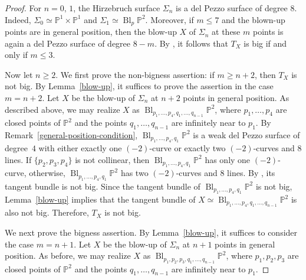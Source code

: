 \documentclass[reqno]{amsart}
\theoremstyle{definition}
\newcommand{\PP}{\mathbb{P}}
\newcommand{\tS}{X}
\newcommand{\Bl}{\operatorname{Bl}}
\begin{document}
\begin{proof}
For $n=0,\,1$, the Hirzebruch surface $\Sigma_n$ is a del Pezzo surface of degree $8$.
Indeed, $\Sigma_0\simeq\PP^1\times\PP^1$ and $\Sigma_1\simeq \Bl_p\PP^2$.
Moreover, if $m\leq 7$ and the blown-up points are in general position, then the blow-up $\tS$ of $\Sigma_n$ at these $m$ points is again a del Pezzo surface of degree $8-m$.
By \cite{HLS22}, it follows that $T_{\tS}$ is big if and only if $m\leq 3$.

Now let $n\geq 2$.
We first prove the non-bigness assertion: if $m\geq n+2$, then $T_{\tS}$ is not big.
By Lemma~\ref{blow-up}, it suffices to prove the assertion in the case $m=n+2$.
Let $\tS$ be the blow-up of $\Sigma_n$ at $n+2$ points in general position.
As described above, we may realize $\tS$ as $\Bl_{p_1,\ldots,p_4,q_1,\ldots,q_{n-1}}\PP^2$, where $p_1,\ldots,p_4$ are closed points of $\PP^2$ and the points $q_1,\ldots,q_{n-1}$ are infinitely near to $p_1$.
By Remark~\ref{general-position-condition}, $\Bl_{p_1,\ldots,p_4,q_1}\PP^2$ is a weak del Pezzo surface of degree~$4$ with either exactly one $(-2)$-curve or exactly two $(-2)$-curves and 8 lines.
If $\{p_2,p_3,p_4\}$ is not collinear, then $\Bl_{p_1,\ldots,p_4,q_1}\PP^2$ has only one $(-2)$-curve, otherwise, $\Bl_{p_1,\ldots,p_4,q_1}\PP^2$ has two $(-2)$-curves and $8$ lines.
By \cite[Theorem~1.2]{KKL24}, its tangent bundle is not big.
Since the tangent bundle of $\Bl_{p_1,\ldots,p_4,q_1}\PP^2$ is not big, Lemma~\ref{blow-up} implies that the tangent bundle of $\tS\simeq \Bl_{p_1,\ldots,p_4,q_1,\ldots,q_{n-1}}\PP^2$ is also not big.
Therefore, $T_{\tS}$ is not big.

We next prove the bigness assertion.
By Lemma~\ref{blow-up}, it suffices to consider the case $m=n+1$.
Let $\tS$ be the blow-up of $\Sigma_n$ at $n+1$ points in general position.
As before, we may realize $\tS$ as $\Bl_{p_1,p_2,p_3,q_1,\ldots,q_{n-1}}\PP^2$, where $p_1,p_2,p_3$ are closed points of $\PP^2$ and the points $q_1,\ldots,q_{n-1}$ are infinitely near to $p_1$.


\end{proof}
\end{document}
